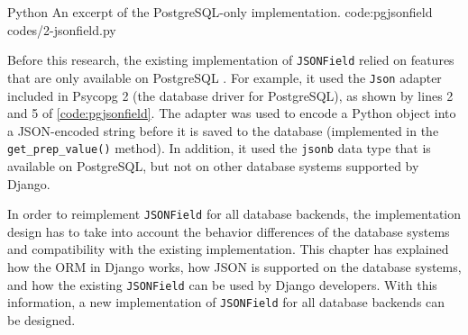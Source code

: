 \listing
{Python}
{An excerpt of the PostgreSQL-only  implementation.}
{code:pgjsonfield}
{codes/2-jsonfield.py}

Before this research, the existing implementation of \verb|JSONField| relied on
features that are only available on PostgreSQL \cite{django:pgjsonfield}. For
example, it used the \verb|Json| adapter included in Psycopg 2 (the database
driver for PostgreSQL), as shown by lines 2 and 5 of
\autoref{code:pgjsonfield}. The adapter was used to encode a Python object into
a JSON-encoded string before it is saved to the database (implemented in the
\verb|get_prep_value()| method). In addition, it used the \verb|jsonb| data
type that is available on PostgreSQL, but not on other database systems
supported by Django.

In order to reimplement \verb|JSONField| for all database backends, the
implementation design has to take into account the behavior differences of the
database systems and compatibility with the existing implementation.
This chapter has explained how the ORM in Django works, how JSON is supported
on the database systems, and how the existing \verb|JSONField| can be used by
Django developers. With this information, a new implementation of
\verb|JSONField| for all database backends can be designed.
